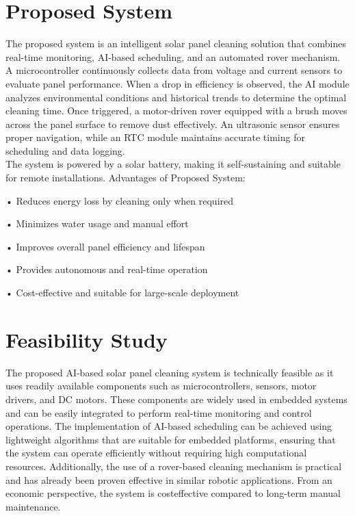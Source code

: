 \documentclass[10pt]{report}
\begin{document}
\begin{sloppypar}
{{{\begin{sloppypar}
\section{Proposed System}
\hspace{0.5cm}
The proposed system is an intelligent solar panel cleaning solution that combines real-time monitoring, AI-based scheduling, and an automated rover mechanism. A microcontroller continuously collects data from voltage and current sensors
to evaluate panel performance. When a drop in efficiency is observed, the AI module analyzes environmental conditions and historical trends to determine the optimal
cleaning time. Once triggered, a motor-driven rover equipped with a brush moves
across the panel surface to remove dust effectively. An ultrasonic sensor ensures
proper navigation, while an RTC module maintains accurate timing for scheduling
and data logging. \\

The system is powered by a solar battery, making it self-sustaining
and suitable for remote installations.
Advantages of Proposed System:
\item• Reduces energy loss by cleaning only when required
\item• Minimizes water usage and manual effort
\item• Improves overall panel efficiency and lifespan
\item• Provides autonomous and real-time operation
\item• Cost-effective and suitable for large-scale deployment

\section{Feasibility Study}
\hspace{0.5cm}
The proposed AI-based solar panel cleaning system is technically feasible as it
uses readily available components such as microcontrollers, sensors, motor drivers,
and DC motors. These components are widely used in embedded systems and can
be easily integrated to perform real-time monitoring and control operations. The implementation of AI-based scheduling can be achieved using lightweight algorithms
that are suitable for embedded platforms, ensuring that the system can operate efficiently without requiring high computational resources. Additionally, the use of a
rover-based cleaning mechanism is practical and has already been proven effective
in similar robotic applications. From an economic perspective, the system is costeffective compared to long-term manual maintenance.
\\


\end{sloppypar}}}}
\end{sloppypar}
\end{document}
